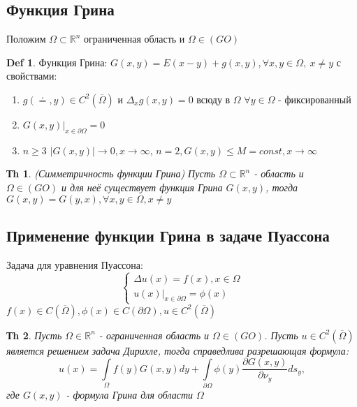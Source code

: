 \documentclass[14pt]{article}
\theoremstyle{plain}
\newtheorem{Thm}{Тh}
\theoremstyle{definition}
\newtheorem{Def}{Def}
\begin{document}
	\subsection{Функция Грина}
		Положим $\Omega \subset \mathbb{R}^n$ ограниченная область и $\Omega \in (GO)$
		\begin{Def}
			Функция Грина: $G(x,y) = E(x-y) + g(x,y), \forall x, y \in \Omega, \ x \neq y$ с свойствами:
			\begin{enumerate}
				\item $g(\doteq, y) \in C^2(\overline{\Omega})$ и $\Delta_x g(x,y) = 0$ всюду в $\Omega$ $\forall y \in \Omega$ - фиксированный
				\item $G(x,y) |_{x\in \partial \Omega} = 0$
				\item $n \geq 3$ $|G(x,y)| \to 0, x \to \infty$, $n =2, G(x,y) \leq M = const, x \to \infty$
			\end{enumerate}
		\end{Def}
		\begin{Thm}
			(Симметричность функции Грина)\newline
			Пусть  $\Omega \subset \mathbb{R}^n$ -  область и $\Omega \in (GO)$  и для неё существует функция Грина $G(x,y)$, тогда $G(x,y) = G(y,x), \forall x, y \in \Omega, x \neq y$
		\end{Thm}
		\subsection{Применение функции Грина в задаче Пуассона}
		Задача для уравнения Пуассона:
		\begin{equation*}
					\left\{ 
			\begin{array}{ll} 
				\Delta u(x) = f(x), x\in \Omega\\
				u(x) |_{x \in \partial \Omega} = \phi(x) \end{array}\right.
		\end{equation*}
		$f(x) \in C(\overline{\Omega}), \phi(x) \in C(\partial \Omega), u \in C^2(\overline{\Omega})$
		\newline
		\begin{Thm}
			Пусть $\Omega \in \mathbb{R}^n$ - ограниченная область и $\Omega \in (GO)$. Пусть $u\in C^2(\overline{\Omega})$ является решением задача Дирихле, тогда справедлива разрешающая формула:
			$$
				u(x) = \int\limits_{\Omega} f(y) G(x,y) dy + \int\limits_{\partial \Omega} \phi(y) \dfrac{\partial G(x,y)}{\partial \nu_y} ds_y, 
			$$
			где $G(x,y)$ - формула Грина для области $\Omega$
		\end{Thm}
	
\end{document}
